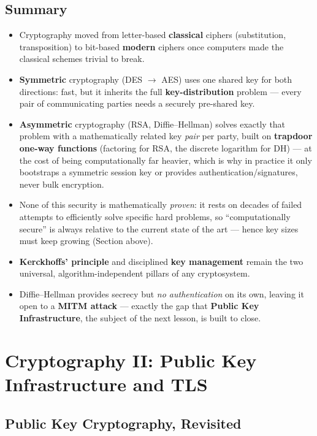 \documentclass[12pt, a4paper]{article}
\begin{document}
\subsection{Summary}
\begin{itemize}
    \item Cryptography moved from letter-based \textbf{classical} ciphers (substitution, transposition) to bit-based \textbf{modern} ciphers once computers made the classical schemes trivial to break.
    \item \textbf{Symmetric} cryptography (DES $\to$ AES) uses one shared key for both directions: fast, but it inherits the full \textbf{key-distribution} problem --- every pair of communicating parties needs a securely pre-shared key.
    \item \textbf{Asymmetric} cryptography (RSA, Diffie--Hellman) solves exactly that problem with a mathematically related key \emph{pair} per party, built on \textbf{trapdoor one-way functions} (factoring for RSA, the discrete logarithm for DH) --- at the cost of being computationally far heavier, which is why in practice it only bootstraps a symmetric session key or provides authentication/signatures, never bulk encryption.
    \item None of this security is mathematically \emph{proven}: it rests on decades of failed attempts to efficiently solve specific hard problems, so ``computationally secure'' is always relative to the current state of the art --- hence key sizes must keep growing (Section above).
    \item \textbf{Kerckhoffs' principle} and disciplined \textbf{key management} remain the two universal, algorithm-independent pillars of any cryptosystem.
    \item Diffie--Hellman provides secrecy but \emph{no authentication} on its own, leaving it open to a \textbf{MITM attack} --- exactly the gap that \textbf{Public Key Infrastructure}, the subject of the next lesson, is built to close.
\end{itemize}


\section{Cryptography II: Public Key Infrastructure and TLS}

\subsection{Public Key Cryptography, Revisited}
\end{document}
